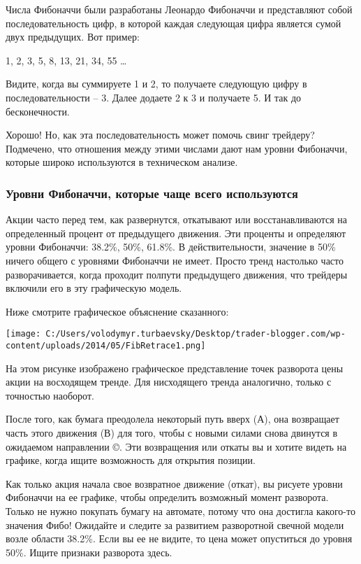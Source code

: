 \documentclass[a5paper]{article}
\begin{document}
Числа Фибоначчи были разработаны Леонардо Фибоначчи и представляют собой последовательность цифр, в которой каждая следующая цифра является сумой двух предыдущих. Вот пример:

1, 2, 3, 5, 8, 13, 21, 34, 55 …

Видите, когда вы суммируете 1 и 2, то получаете следующую цифру в последовательности – 3. Далее додаете 2 к 3 и получаете 5. И так до бесконечности.

Хорошо! Но, как эта последовательность может помочь свинг трейдеру?
Подмечено, что отношения между этими числами дают нам уровни
Фибоначчи, которые широко используются в техническом анализе.

\subsubsection{Уровни Фибоначчи, которые чаще всего используются}

Акции часто перед тем, как развернутся, откатывают или восстанавливаются на определенный процент от предыдущего движения. Эти проценты и определяют уровни Фибоначчи: 38.2\%, 50\%, 61.8\%. В действительности, значение в 50\% ничего общего с уровнями Фибоначчи не имеет. Просто тренд настолько часто разворачивается, когда проходит полпути предыдущего движения, что трейдеры включили его в эту графическую модель.

Ниже смотрите графическое объяснение сказанного:

\texttt{[image: C:/Users/volodymyr.turbaevsky/Desktop/trader-blogger.com/wp-content/uploads/2014/05/FibRetrace1.png]}

На этом рисунке изображено графическое представление точек разворота цены акции на восходящем тренде. Для нисходящего тренда аналогично, только с точностью наоборот.

После того, как бумага преодолела некоторый путь вверх (А), она возвращает часть этого движения (В) для того, чтобы с новыми силами снова двинутся в ожидаемом направлении ©. Эти возвращения или откаты вы и хотите видеть на графике, когда ищите возможность для открытия позиции.

Как только акция начала свое возвратное движение (откат), вы рисуете уровни Фибоначчи на ее графике, чтобы определить возможный момент разворота. Только не нужно покупать бумагу на автомате, потому что она достигла какого-то значения Фибо! Ожидайте и следите за развитием разворотной свечной модели возле области 38.2\%. Если вы ее не видите, то цена может опуститься до уровня 50\%. Ищите признаки разворота здесь.
\end{document}
